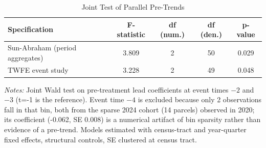 \begin{table}[htbp]
\centering
\caption{Joint Test of Parallel Pre-Trends}
\label{tab:appx_pretrends}
\small
\begin{tabular}{lcccc}
\toprule
Specification & F-statistic & df (num.) & df (den.) & p-value \\
\midrule
Sun-Abraham (period aggregates) & 3.809 & 2 & 50 & 0.029 \\
TWFE event study & 3.228 & 2 & 49 & 0.048 \\
\bottomrule
\end{tabular}
\begin{tablenotes}\small
\item \textit{Notes:} Joint Wald test on pre-treatment lead coefficients at event times $-2$ and $-3$ (t=-1 is the reference).
Event time $-4$ is excluded because only 2 observations fall in that bin, both from the sparse 2024 cohort (14 parcels) observed in 2020; its coefficient (-0.062, SE 0.008) is a numerical artifact of bin sparsity rather than evidence of a pre-trend.
Models estimated with census-tract and year-quarter fixed effects, structural controls, SE clustered at census tract.
\end{tablenotes}
\end{table}
